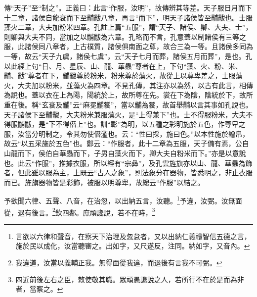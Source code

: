 {\noindent\zhuan{}\fzbyks 傳“天子”至“制之”。正義曰：此言“作服，汝明”，故傳辨其等差。天子服日月而下十二章，諸侯自龍袞而下至黼黻八章，再言“而下”，明天子諸侯皆至黼黻也。士服藻火二章，大夫加粉米四章。孔註上篇“五服”，謂“天子、諸侯、卿、大夫、士”，則卿與大夫不同，當加之以黼黻為六章。孔略而不言，孔意蓋以制諸侯有三等之服，此諸侯同八章者，上古樸質，諸侯俱南面之尊，故合三為一等。且諸侯多同為一等，故云“天子九虞，諸侯七虞”，云“天子七月而葬，諸侯五月而葬”，是也。孔以此經上句“日、月、星辰、山、龍、華蟲”尊者在上，下句“藻、火、粉、米、黼、黻”尊者在下，黼黻尊於粉米，粉米尊於藻火，故從上以尊卑差之，士服藻火，大夫加以粉米，並藻火為四章。不見孔傳，其注亦以為然，以古有此言，相傳為說也。蓋以衣在上為陽，陽統於上，故所尊在先。裳在下為陰，陰統於下，故所重在後。稱“玄袞及黼”云“麻冕黼裳”，當以黼為裳，故首舉黼以言其事如孔說也。天子諸侯下至黼黻，大夫粉米兼服藻火，是“上得兼下”也。士不得服粉米，大夫不得服黼黻，是“下不得僣上”也。訓“彰”為明，以五種之彩明施於五色，作尊卑之服，汝當分明制之，令其勿使僣濫也。云：“性曰採，施曰色。”以本性施於繒帛，故云“以五采施於五色”也。鄭云：“作服者，此十二章為五服，天子備有焉，公自山龍而下，侯伯自華蟲而下，子男自藻火而下，卿大夫自粉米而下。”亦是以意說也。此云“作服”，推據衣服，所以經有“宗彝”，及孔雲旌旗亦以山、龍、華蟲為飾者，但此雖以服為主，上既云“古人之象”，則法象分在器物，皆悉明之，非止衣服而已。旌旗器物皆是彩飾，被服以明尊卑，故總云“作服”以結之。 \par}

予欲聞六律、五聲、八音，在治忽，以出納五言，汝聽。\footnote{言欲以六律和聲音，在察天下治理及忽怠者，又以出納仁義禮智信五德之言，施於民以成化，汝當聽審之。出如字，又尺遂反，注同。納如字，又音內。}予違，汝弼。汝無面從，退有後言。\footnote{我違道，汝當以義輔正我。無得面從我違，而退後有言我不可弼。}欽四鄰。庶頑讒說，若不在時，\footnote{四近前後左右之臣，敕使敬其職。眾頑愚讒說之人，若所行不在於是而為非者，當察之。}


